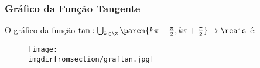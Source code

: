 \subsubsection{Gráfico da Função Tangente}

\begin{example}
O gráfico da função $\tan: \bigcup_{k \in \Z} \paren{k \pi - \frac
{\pi} 2, k \pi + \frac {\pi} 2} \to \reais$ é:
%
\begin{figure}
\centering
\texttt{[image: \\imgdirfromsection/graftan.jpg]}
\end{figure}
\end{example}